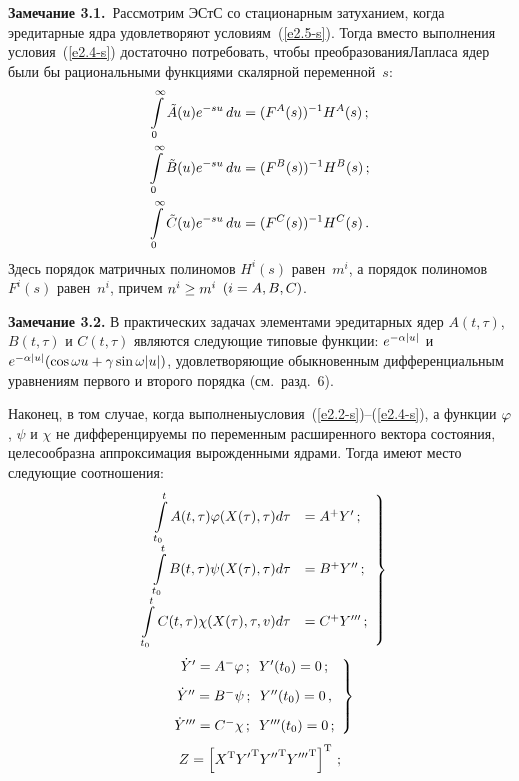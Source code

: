 \begin{multicols}{2}
\medskip

\noindent
\textbf{Замечание 3.1.}\ Рассмотрим ЭСтС со стационарным затуханием, когда эредитарные 
ядра удовлетворяют условиям~(\ref{e2.5-s}). Тогда вместо выполнения условия~(\ref{e2.4-s}) 
достаточно потребовать, чтобы преобразования\linebreak Лап\-ла\-са ядер были бы рациональными 
функциями скалярной переменной~$s$:
\begin{align*}
\int\limits_0^\infty \tilde A(u) e^{-su} \,du &= (F^A (s))^{-1} H^A (s)\,;\\
    \int\limits_0^\infty \tilde B(u) e^{-su}\, du &= (F^B (s))^{-1} H^B (s)\,;\\
\int\limits_0^\infty \tilde C(u) e^{-su} \,du &= (F^C (s))^{-1} H^C (s)\,.
\end{align*}
Здесь порядок матричных полиномов  $H^i (s)$ равен~$m^i$, а порядок полиномов  $F^i (s)$ 
равен~$n^i$, причем $n^i\hm\ge m^i$ $(i\hm=A,B,C)$.

\medskip

\noindent
\textbf{Замечание 3.2.}
В практических задачах элементами эредитарных ядер $A(t,\tau)$, $B(t,\tau)$ и $C(t,\tau)$  
являются следующие типовые функции: $e^{-\alpha |u|}$ и 
$e^{-\alp |u|} (\cos \w u \hm+\gamma \sin \w |u|)$, удовлетворяющие обыкновенным 
дифференциальным уравнениям первого и второго порядка (см.\ разд.~6).

Наконец, в том случае, когда выполнены\linebreak условия~(\ref{e2.2-s})--(\ref{e2.4-s}), а функции 
$\varphi$, $\psi$ и $\chi$ не диф\-фе\-рен\-ци\-ру\-емы по переменным расширенного вектора состояния, 
целесообразна аппроксимация вы\-рож\-ден\-ны\-ми ядрами. Тогда имеют место следующие 
соотношения:
\begin{equation}
\left.
\begin{array}{rl}
\displaystyle\int\limits_{t_0}^t A(t,\tau) \varphi(X(\tau),  \tau) d\tau &= A^+ Y'\,;\\[9pt]
\displaystyle    \int\limits_{t_0}^t B(t,\tau) \psi(X(\tau),  \tau) d\tau &= B^+ Y''\,;\\[9pt]
\displaystyle\int\limits_{t_0}^t C(t,\tau) \chi(X(\tau),  \tau,v) d\tau &= C^+ Y'''\,;
\end{array}
\right\}
\label{e3.16-s}
\end{equation}
\begin{equation}
\left.
\begin{array}{c}        
\dot Y'=A^-\varphi\,;\enskip Y'(t_0)=0\,;\\[9pt]
        \dot Y''=B^-\psi\,;\enskip
        Y''(t_0)=0\,,\\[9pt] 
        \dot Y'''=C^-\chi\,;\enskip Y'''(t_0)=0\,;
        \end{array}
        \right\}
        \label{e3.17-s}
        \end{equation}
\begin{equation}
Z=\left[ X^{\mathrm{T}} {Y'}^{\mathrm{T}} {Y''}^{\mathrm{T}} {Y'''}^{\mathrm{T}}\right]^{\mathrm{T}}\,;\label{e3.18-s}
\end{equation}


\end{multicols}
